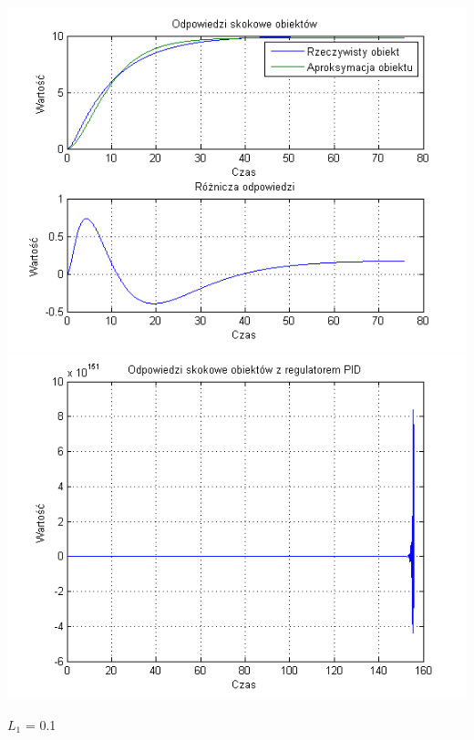 \documentclass[10pt,a4paper]{article}
\begin{document}
\begin{center}
\includegraphics[scale=1]{images/dwa/skrypt_211.png}\\
\includegraphics[scale=1]{images/dwa/skrypt_212.png}\\
\end{center}
\newpage
$L_1$ = 0.1
\end{document}
